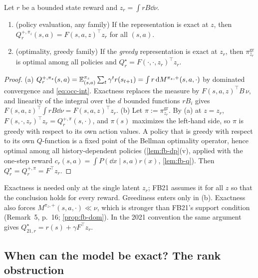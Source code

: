 \begin{theorem}\label{thm:m-fb}
Let $r$ be a bounded state reward and $z_r=\int rB\dd\nu$.
\begin{enumerate}[nosep,label=(\alph*)]
\item (policy evaluation, any family) If the representation is exact at $z$, then $Q^{+,\pi_z}_r(s,a)=F(s,a,z)^\top z_r$ for all $(s,a)$.
\item (optimality, greedy family) If the \emph{greedy} representation is exact at $z_r$, then $\pi^{\mathrm{gr}}_{z_r}$ is optimal among all policies and $Q^\star_r=F(\cdot,\cdot,z_r)^\top z_r$.
\end{enumerate}
\end{theorem}
\begin{proof}
(a) $Q^{+,\pi_z}_r(s,a)=\mathbb{E}^{\pi_z}_{(s,a)}\sum_t\gamma^tr(s_{t+1})=\int r\,\mathrm{d} M^{\pi_z,+}(s,a,\cdot)$ by dominated convergence and \eqref{eq:occ-int}. Exactness replaces the measure by $F(s,a,z)^\top B\,\nu$, and linearity of the integral over the $d$ bounded functions $rB_i$ gives $F(s,a,z)^\top\int rB\dd\nu=F(s,a,z)^\top z_r$.
(b) Let $\pi:=\pi^{\mathrm{gr}}_{z_r}$. By (a) at $z=z_r$, $F(s,\cdot,z_r)^\top z_r=Q^{+,\pi}_r(s,\cdot)$, and $\pi(s)$ maximizes the left-hand side, so $\pi$ is greedy with respect to its own action values. A policy that is greedy with respect to its own $Q$-function is a fixed point of the Bellman optimality operator, hence optimal among all history-dependent policies (\cref{lem:fb-dp}(v), applied with the one-step reward $c_r(s,a)=\int P(\dd x\mid s,a)r(x)$, \cref{lem:fb-q}). Then $Q^\star_r=Q^{+,\pi}_r=F^\top z_r$.
\end{proof}

Exactness is needed only at the single latent $z_r$; FB21 assumes it for all $z$ so that the conclusion holds for every reward.
Greediness enters only in (b).
Exactness also forces $M^{\pi_z,+}(s,a,\cdot)\ll\nu$, which is stronger than FB21's support condition (Remark~5, p.~16; \cref{prop:fb-dom}).
In the 2021 convention the same argument gives $Q^\star_{21,r}=r(s)+\gamma F^\top z_r$.

\subsection{When can the model be exact? The rank obstruction}

